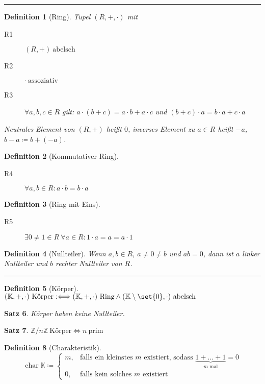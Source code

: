 \documentclass[a4paper]{article}
\newcounter{Sec}
\theoremstyle{marginbreak}
\newtheorem{definition}{Definition}[Sec]
\newtheorem{satz}[definition]{Satz}
\DeclareMathOperator{\chop}{char}
\newcommand{\sep}{%
	\rule{\textwidth}{0.3pt}%
	\stepcounter{Sec}%
	}
\begin{document}
	\sep
	\begin{definition}[Ring]
		Tupel $(R, +, \cdot)$ mit
		\begin{description}
			\item[R1] $(R, +)~\text{abelsch}$
			\item[R2] $\cdot~\text{assoziativ}$
			\item[R3] $\forall a, b, c \in R$ gilt: $a\cdot(b + c) = a\cdot b + a\cdot c$ und $(b + c)\cdot a = b\cdot a + c\cdot a$
		\end{description}

		Neutrales Element von $(R, +)$ heißt $0$, inverses Element zu $a \in R$ heißt $-a$, $b - a \coloneqq b + (-a)$.
	\end{definition}
	\begin{definition}[Kommutativer Ring]
		\begin{description}
			\item[R4] $\forall a, b \in R: a \cdot b = b \cdot a$
		\end{description}
	\end{definition}
	\begin{definition}[Ring mit Eins]
		\begin{description}
			\item[R5] $\exists 0 \neq 1 \in R~\forall a \in R: 1 \cdot a = a = a \cdot 1$
		\end{description}
	\end{definition}
	\begin{definition}[Nullteiler]
		Wenn $a, b \in R$, $a \neq 0 \neq b$ und $ab = 0$, dann ist $a$ linker Nullteiler
		und $b$ rechter Nullteiler von $R$.
	\end{definition}
	\sep
	\begin{definition}[Körper]
		$(\mathbb{K}, +, \cdot)~\text{Körper} :\Longleftrightarrow (\mathbb{K}, +, \cdot)~\text{Ring}
		\wedge (\mathbb{K}\setminus\set{0}, \cdot)~\text{abelsch}$
	\end{definition}
	\begin{satz}
		Körper haben keine Nullteiler.
	\end{satz}
	\begin{satz}
		$\mathbb{Z}/n\mathbb{Z}~\text{Körper} \iff n~\text{prim}$
	\end{satz}
	\begin{definition}[Charakteristik]
		\[\chop\mathbb{K} \coloneqq\begin{cases}
			m, &\text{falls ein kleinstes $m$ existiert, sodass $\underbrace{1 + \ldots + 1}_{\text{$m$ mal}} = 0$}\\
			0, & \text{falls kein solches $m$ existiert}
		\end{cases}\]
	\end{definition}
\end{document}
